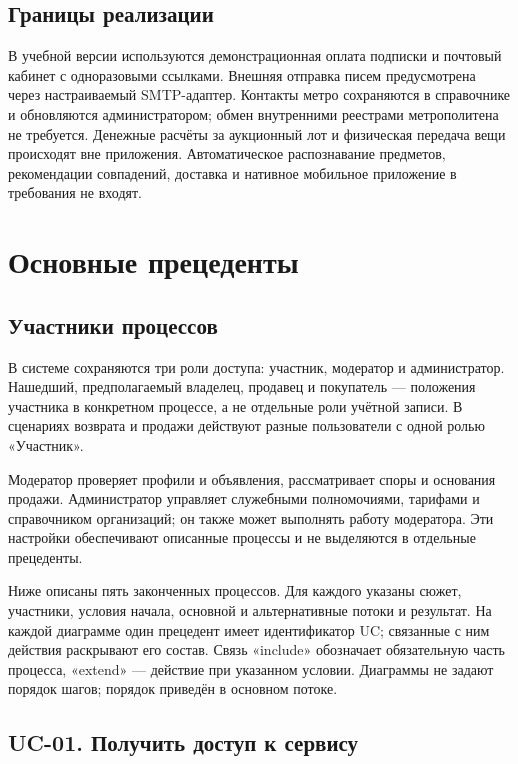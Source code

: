 \FloatBarrier
{}
\subsection{Границы реализации}

В учебной версии используются демонстрационная оплата подписки и почтовый кабинет с одноразовыми ссылками. Внешняя отправка писем предусмотрена через настраиваемый SMTP-адаптер. Контакты метро сохраняются в справочнике и обновляются администратором; обмен внутренними реестрами метрополитена не требуется. Денежные расчёты за аукционный лот и физическая передача вещи происходят вне приложения. Автоматическое распознавание предметов, рекомендации совпадений, доставка и нативное мобильное приложение в требования не входят.

\clearpage
\section{Основные прецеденты}

\FloatBarrier
{}
\subsection{Участники процессов}

В системе сохраняются три роли доступа: участник, модератор и администратор. Нашедший, предполагаемый владелец, продавец и покупатель — положения участника в конкретном процессе, а не отдельные роли учётной записи. В сценариях возврата и продажи действуют разные пользователи с одной ролью «Участник».

Модератор проверяет профили и объявления, рассматривает споры и основания продажи. Администратор управляет служебными полномочиями, тарифами и справочником организаций; он также может выполнять работу модератора. Эти настройки обеспечивают описанные процессы и не выделяются в отдельные прецеденты.

Ниже описаны пять законченных процессов. Для каждого указаны сюжет, участники, условия начала, основной и альтернативные потоки и результат. На каждой диаграмме один прецедент имеет идентификатор UC; связанные с ним действия раскрывают его состав. Связь «include» обозначает обязательную часть процесса, «extend» — действие при указанном условии. Диаграммы не задают порядок шагов; порядок приведён в основном потоке.

\FloatBarrier
{}
\subsection{UC-01. Получить доступ к сервису}

